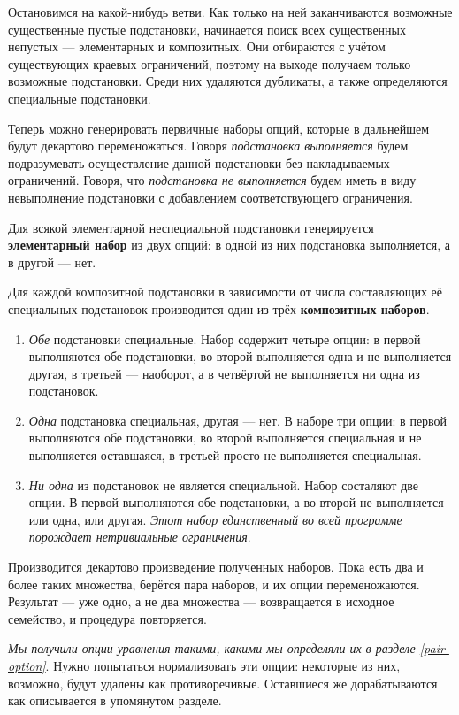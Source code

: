 \documentclass[12pt]{article}
\begin{document}
Остановимся на какой-нибудь ветви. Как только на ней заканчиваются возможные
существенные пустые подстановки, начинается поиск всех существенных непустых
--- элементарных и композитных. Они отбираются с учётом существующих краевых
ограничений, поэтому на выходе получаем только возможные подстановки. Среди
них удаляются дубликаты, а также определяются специальные подстановки.

Теперь можно генерировать первичные наборы опций, которые в дальнейшем будут
декартово переменожаться. Говоря \textit{подстановка выполняется} будем
подразумевать осуществление данной подстановки без накладываемых ограничений.
Говоря, что \textit{подстановка не выполняется} будем иметь в виду невыполнение
подстановки с добавлением соответствующего ограничения.

Для всякой элементарной неспециальной подстановки генерируется
\textbf{элементарный набор} из двух опций: в одной из них подстановка
выполняется, а в другой --- нет.

Для каждой композитной подстановки в зависимости от числа составляющих её
специальных подстановок производится один из трёх \textbf{композитных наборов}.
\begin{enumerate}
  \item \textit{Обе} подстановки специальные. Набор содержит четыре опции:
  в первой выполняются обе подстановки, во второй выполняется одна и не
  выполняется другая, в третьей --- наоборот, а в четвёртой не выполняется
  ни одна из подстановок.
  
\item \textit{Одна} подстановка специальная, другая --- нет. В наборе
  три опции: в первой выполняются обе подстановки, во второй выполняется
  специальная и не выполняется оставшаяся, в третьей просто не выполняется
  специальная.
    
\item \textit{Ни одна} из подстановок не является специальной. Набор
  состаляют две опции. В первой выполняются обе подстановки, а во второй не
  выполняется или одна, или другая. \textit{Этот набор единственный во
  всей программе порождает нетривиальные ограничения}.
\end{enumerate}

Производится декартово произведение полученных наборов. Пока есть два и более
таких множества, берётся пара наборов, и их опции переменожаются. Результат
--- уже одно, а не два множества --- возвращается в исходное семейство, и
процедура повторяется.

\textit{Мы получили опции уравнения такими, какими мы определяли их в разделе
\emph{\ref{pair-option}}}. Нужно попытаться нормализовать эти опции: некоторые
из них, возможно, будут удалены как противоречивые. Оставшиеся же
дорабатываются как описывается в упомянутом разделе.
\end{document}

